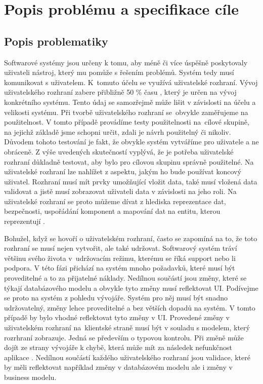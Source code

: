 \chapter{Popis problému a specifikace cíle}
\section{Popis problematiky}
Softwarové systémy jsou určeny k tomu, aby méně či více úspěšně poskytovaly uživateli nástroj, který mu pomůže s řešením problémů. Systém tedy musí komunikovat s uživatelem. K~tomuto účelu se využívá uživatelské rozhraní. Vývoj uživatelského rozhraní zabere přibližně 50 \% času \cite{cernyTSUID}, který je určen na vývoj konkrétního systému. Tento údaj se samozřejmě může lišit v závislosti na účelu a velikosti systému. Při tvorbě uživatelského rozhraní se~obvykle zaměřujeme na použitelnost. V tomto případě provádíme testy použitelnosti na~cílové skupině, na jejichž základě jsme schopni určit, zdali je návrh použitelný či nikoliv. Důvodem tohoto testování je fakt, že obvykle systém vytváříme pro uživatele a ne obráceně. Z výše uvedených skutečností vyplývá, že je potřeba uživatelské rozhraní důkladně testovat, aby bylo pro cílovou skupinu správně použitelné. Na uživatelské rozhraní lze nahlížet z aspektu, jakým ho bude používat koncový uživatel. Rozhraní musí mít prvky umožňující vložit data, také musí vložená data validovat a jistě musí zobrazovat uživateli data v závislosti na jeho roli. Na uživatelské rozhraní se proto můžeme dívat z hlediska reprezentace dat, bezpečnosti, uspořádání komponent a mapování dat na entitu, kterou reprezentují \cite{cernyTEA}. 

Bohužel, když se hovoří o uživatelském rozhraní, často se zapomíná na to, že toto rozhraní se musí nejen vytvořit, ale také udržovat. Softwarový systém tráví většinu svého života v~udržovacím režimu, kterému se říká support nebo li podpora. V této fázi přichází na systém mnoho požadavků, které musí být proveditelné a to za přijatelné náklady. Nedílnou součástí jsou změny, které se týkají databázového modelu a obvykle tyto změny musí reflektovat UI. Podívejme se proto na systém z pohledu vývojáře. Systém pro něj musí být snadno udržovatelný, změny lehce proveditelné a bez větších dopadů na systém. V tomto případě by bylo vhodné reflektovat tyto změny v UI. Provedené změny v uživatelském rozhraní na~klientské straně musí být v souladu s modelem, který rozrhraní zobrazuje. Jedná se především o typovou kontrolu. Při změně může dojít ze strany vývojáře k chybě, která může mít za následek nefunkčnost aplikace \cite{aspectdriven}. Nedílnou součástí každého uživatelského rozhraní jsou validace, které by měli reflektovat například změny v databázovém modelu ale i změny v business modelu.

